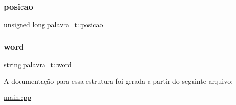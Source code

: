 \subsubsection{\texorpdfstring{posicao\_}{posicao\_}}
{\footnotesize\ttfamily unsigned long palavra\+\_\+t\+::posicao\+\_\+}

\mbox{\label{structpalavra__t_a91347e04a25cc9441280eaf177fc3ef3}} 
\subsubsection{\texorpdfstring{word\_}{word\_}}
{\footnotesize\ttfamily string palavra\+\_\+t\+::word\+\_\+}



A documentação para essa estrutura foi gerada a partir do seguinte arquivo\+:\begin{DoxyCompactItemize}
\item 
\mbox{\hyperlink{main_8cpp}{main.\+cpp}}\end{DoxyCompactItemize}
